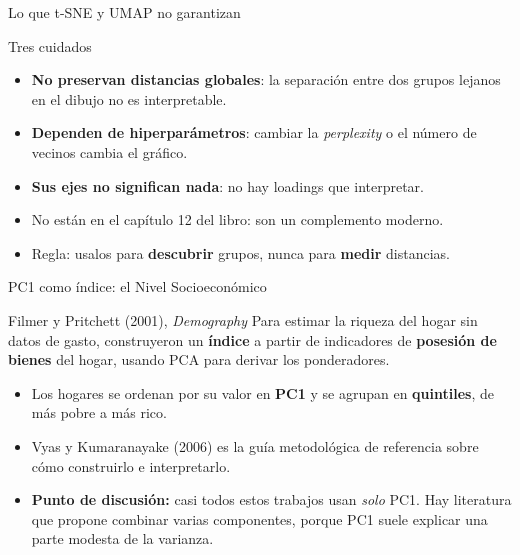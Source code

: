 \documentclass[aspectratio=169,xcolor=dvipsnames]{beamer}
\begin{document}
\begin{frame}{Lo que t-SNE y UMAP no garantizan}
    \begin{alertblock}{Tres cuidados}
        \begin{itemize}
            \item \textbf{No preservan distancias globales}: la separaci\'on entre dos grupos lejanos en el dibujo \alert{no es interpretable}.
            \item \textbf{Dependen de hiperpar\'ametros}: cambiar la \emph{perplexity} o el n\'umero de vecinos cambia el gr\'afico.
            \item \textbf{Sus ejes no significan nada}: no hay loadings que interpretar.
        \end{itemize}
    \end{alertblock}
    \begin{itemize}
        \item No est\'an en el cap\'itulo 12 del libro: son un complemento moderno.
        \item Regla: usalos para \textbf{descubrir} grupos, nunca para \textbf{medir} distancias.
    \end{itemize}
\end{frame}

\begin{frame}{PC1 como \'indice: el Nivel Socioecon\'omico}
    \begin{block}{Filmer y Pritchett (2001), \emph{Demography}}
        Para estimar la riqueza del hogar sin datos de gasto, construyeron un \textbf{\'indice} a partir de indicadores de \textbf{posesi\'on de bienes} del hogar, usando PCA para derivar los \alert{ponderadores}.
    \end{block}
    \begin{itemize}
        \item Los hogares se ordenan por su valor en \textbf{PC1} y se agrupan en \textbf{quintiles}, de m\'as pobre a m\'as rico.
        \item Vyas y Kumaranayake (2006) es la gu\'ia metodol\'ogica de referencia sobre c\'omo construirlo e interpretarlo.
        \item \textbf{Punto de discusi\'on:} casi todos estos trabajos usan \emph{solo} PC1. Hay literatura que propone combinar varias componentes, porque PC1 suele explicar una parte modesta de la varianza.
    \end{itemize}
\end{frame}
\end{document}
